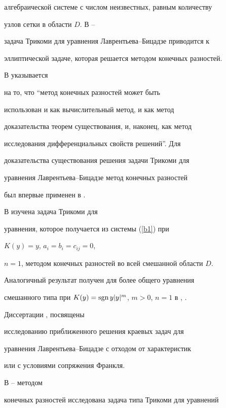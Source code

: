 алгебраической системе с числом неизвестных, равным количеству


узлов сетки в области $D$. В \cite{Ladyjenskaya1}--\cite{Ivleva}


задача Трикоми для уравнения Лаврентьева--Бицадзе приводится к 


эллиптической задаче, которая решается методом конечных разностей.





В \cite{Ladyjenskaya2} указывается


на то, что ``метод конечных разностей может быть


использован и как вычислительный метод, и как метод


доказательства теорем существования, и, наконец, как метод


исследования дифференциальных свойств решений''. Для


доказательства существования решения задачи Трикоми для


уравнения Лаврентьева--Бицадзе метод конечных разностей


был впервые применен в \cite{Karmanov2}.





В \cite{Filippov} изучена задача Трикоми для


уравнения, которое получается из системы (\ref{b1}) при


$K(y)=y$, $a_i=b_i=c_{ij}=0$,


$n=1$, методом конечных разностей во всей смешанной области $D$.


Аналогичный результат получен для более общего уравнения


смешанного типа при $K(y)


= \sgn y|y|^m$, $m>0$, $n=1$ в \cite{Ogawa}, \cite{Kovalenko}.





Диссертации \cite{Vu}, \cite{Ivleva_2} посвящены


исследованию приближенного решения краевых задач для


уравнения Лаврентьева--Бицадзе с отходом от характеристик


или с условиями сопряжения Франкля.


В \cite{Kyazimov}--\cite{Tagiev3} методом


конечных разностей исследована задача типа Трикоми для уравнений


